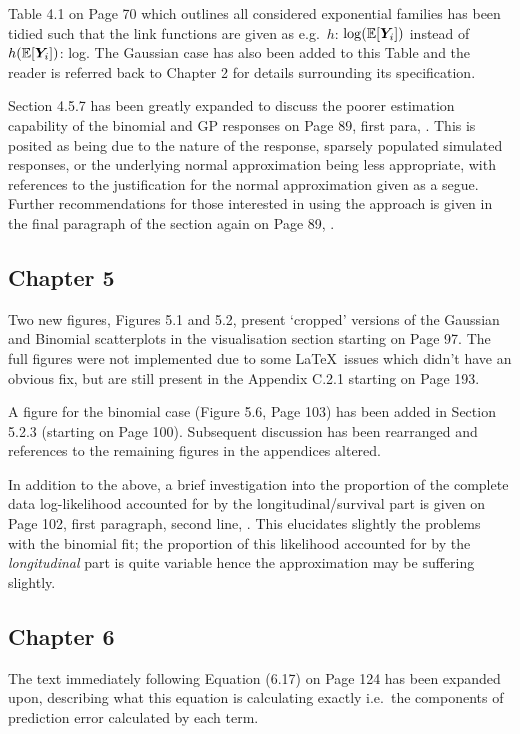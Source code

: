 \documentclass{article}
\begin{document}
Table 4.1 on Page 70 which outlines all considered exponential families has been tidied such that the link functions are given as e.g.\ $h$: $\log\!\left(\operatorname{\mathbb{E}}[\bm{Y}_i]\right)$ instead of $h\!\left(\operatorname{\mathbb{E}}[\bm{Y}_i]\right)$: log. The Gaussian case has also been added to this Table and the reader is referred back to Chapter 2 for details surrounding its specification.

Section 4.5.7 has been greatly expanded to discuss the poorer estimation capability of the binomial and GP responses on Page 89, first para, . This is posited as being due to the nature of the response, sparsely populated simulated responses, or the underlying normal approximation being less appropriate, with references to the justification for the normal approximation given as a segue. Further recommendations for those interested in using the approach is given in the final paragraph of the section again on Page 89, .

\subsection*{Chapter 5}
Two new figures, Figures 5.1 and 5.2, present `cropped' versions of the Gaussian and Binomial scatterplots in the visualisation section starting on Page 97. The full figures were not implemented due to some \LaTeX\ issues which didn't have an obvious fix, but are still present in the Appendix C.2.1 starting on Page 193.

A figure for the binomial case (Figure 5.6, Page 103) has been added in Section 5.2.3 (starting on Page 100). Subsequent discussion has been rearranged and references to the remaining figures in the appendices altered.

In addition to the above, a brief investigation into the proportion of the complete data log-likelihood accounted for by the longitudinal/survival part is given on Page 102, first paragraph, second line, . This elucidates slightly the problems with the binomial fit; the proportion of this likelihood accounted for by the \textit{longitudinal} part is quite variable hence the approximation may be suffering slightly.

\subsection*{Chapter 6}
The text immediately following Equation (6.17) on Page 124 has been expanded upon, describing what this equation is calculating exactly i.e.\ the components of prediction error calculated by each term.
\end{document}
